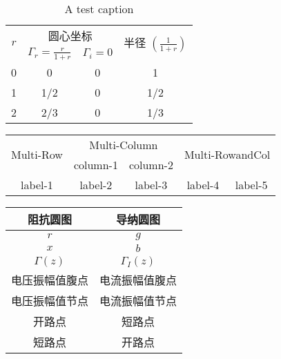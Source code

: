 \documentclass[UTF8]{article}
\begin{document}

\begin{table}
    \centering
    \begin{tabular}{|c|c|c|c|}
        \hline
        \multirow{2}{*}{$r$} & \multicolumn{2}{c|}{\footnotesize{圆心坐标}} & \multirow{2}{*}{\footnotesize{半径} $\left(\frac{1}{1+r}\right)$}       \\
        \cline{2-3}
                             & $\Gamma_r=\frac{r}{1+r}$                 & $\Gamma_i=0$       &       \\
        \hline
        0                    & 0                                        & 0                  & 1   \\
        \hline
        1                    & 1/2                                      & 0                  & 1/2 \\
        \hline
        2                    & 2/3                                      & 0                  & 1/3 \\
        \hline
    \end{tabular}
    \caption{A test caption}
    \label{table1}
\end{table}

\begin{tabular}{|c|c|c|c|c|}
    \hline
    \multirow{2}{*}{Multi-Row}        &  \multicolumn{2}{c|}{Multi-Column}  &  \multicolumn{2}{c|}{\multirow{2}{*}{Multi-RowandCol}}   \\
    \cline{2-3}
                                      & column-1 & column-2 & \multicolumn{2}{c|}{}           \\
    \hline
    label-1                           & label-2  & label-3  & label-4               & label-5 \\
    \hline
\end{tabular}

\begin{tabular}{|c|c|}
    \hline
    \textbf{阻抗圆图} & \textbf{导纳圆图} \\ \hline
    $r$           & $g$           \\ \hline
    $x$           & $b$           \\ \hline
    $\Gamma(z)$   & $\Gamma_I(z)$ \\ \hline
    电压振幅值腹点       & 电流振幅值腹点       \\ \hline
    电压振幅值节点       & 电流振幅值节点       \\ \hline
    开路点           & 短路点           \\ \hline
    短路点           & 开路点           \\
    \hline
\end{tabular}
\end{document}
